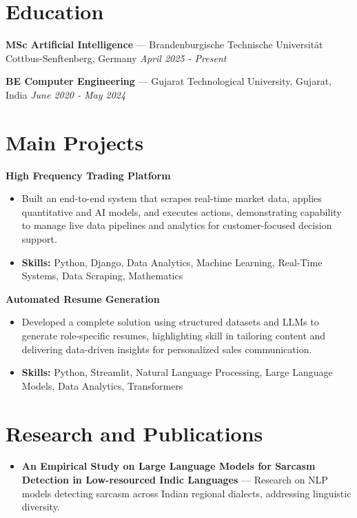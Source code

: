 \documentclass[a4paper,10pt]{article}
\begin{document}
\section*{Education}
\textbf{MSc Artificial Intelligence} — Brandenburgische Technische Universität Cottbus-Senftenberg, Germany \hfill \textit{April 2025 - Present}\par
\vspace{1.5pt}
\textbf{BE Computer Engineering} — Gujarat Technological University, Gujarat, India \hfill \textit{June 2020 - May 2024}\par

\section*{Main Projects}
\textbf{High Frequency Trading Platform}\par
\vspace{1pt}
\begin{itemize}
  \item Built an end-to-end system that scrapes real-time market data, applies quantitative and AI models, and executes actions, demonstrating capability to manage live data pipelines and analytics for customer-focused decision support.
  \item \textbf{Skills:} Python, Django, Data Analytics, Machine Learning, Real-Time Systems, Data Scraping, Mathematics
\end{itemize}
\vspace{3pt}
\textbf{Automated Resume Generation}\par
\vspace{1pt}
\begin{itemize}
  \item Developed a complete solution using structured datasets and LLMs to generate role-specific resumes, highlighting skill in tailoring content and delivering data-driven insights for personalized sales communication.
  \item \textbf{Skills:} Python, Streamlit, Natural Language Processing, Large Language Models, Data Analytics, Transformers
\end{itemize}

\section*{Research and Publications}
\begin{itemize}
\item \textbf{An Empirical Study on Large Language Models for Sarcasm Detection in Low-resourced Indic Languages} — Research on NLP models detecting sarcasm across Indian regional dialects, addressing linguistic diversity.
\end{itemize}
\end{document}
